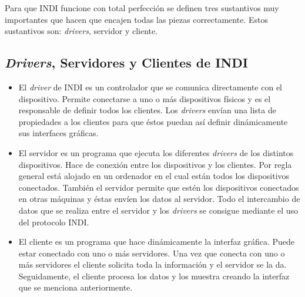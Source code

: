 Para que INDI funcione con total perfección se definen tres sustantivos muy importantes que hacen que encajen todas las piezas correctamente. Estos sustantivos son: \textit{drivers}, servidor y cliente.

\subsection{\textit{Drivers}, Servidores y Clientes de INDI}
\begin{itemize}
  \item El \textit{driver} de INDI es un controlador que se comunica directamente con el dispositivo. Permite conectarse a uno o más dispositivos físicos y es el responsable de definir todos los clientes. Los \textit{drivers} envían una lista de propiedades a los clientes para que éstos puedan así definir dinámicamente sus interfaces gráficas.
  \item El servidor es un programa que ejecuta los diferentes \textit{drivers} de los distintos dispositivos. Hace de conexión entre los dispositivos y los clientes. Por regla general está alojado en un ordenador en el cual están todos los dispositivos conectados. También el servidor permite que estén los dispositivos conectados en otras máquinas y éstas envíen los datos al servidor.
 Todo el intercambio de datos que se realiza entre el servidor y los \textit{drivers} se consigue mediante el uso del protocolo INDI.
  \item El cliente es un programa que hace dinámicamente la interfaz gráfica. Puede estar conectado con uno o más servidores. Una vez que conecta con uno o más servidores el cliente solicita toda la información y el servidor se la da. Seguidamente, el cliente procesa los datos y los muestra creando la interfaz que se menciona anteriormente.
\end{itemize}

